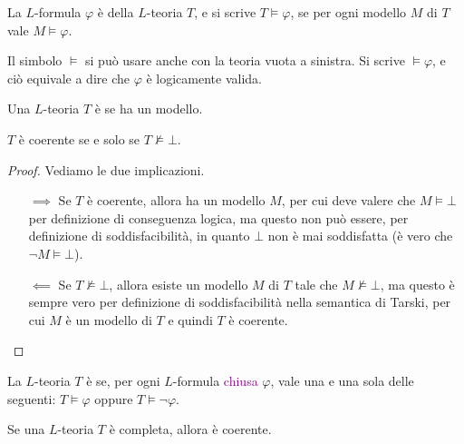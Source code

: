 \begin{definition}
    La $L$-formula $\varphi$ è  della $L$-teoria $T$, e si scrive $T \models \varphi$, se per ogni modello $M$ di $T$ vale $M \models \varphi$.
\end{definition}

\begin{note}
    Il simbolo $\models$ si può usare anche con la teoria vuota a sinistra. Si scrive $\models \varphi$, e ciò equivale a dire che $\varphi$ è logicamente valida.
\end{note}

\begin{definition}[Coerenza]
    Una $L$-teoria $T$ è  se ha un modello.
\end{definition}

\begin{remark}
    $T$ è coerente se e solo se $T \not \models \bot$.
\end{remark}

\begin{proof}
    Vediamo le due implicazioni.
    \begin{itemize}
        \item [$\boxed{\implies}$] Se $T$ è coerente, allora ha un modello $M$, per cui deve valere che $M \models \bot$ per definizione di conseguenza logica, ma questo non può essere, per definizione di soddisfacibilità, in quanto $\bot$ non è mai soddisfatta (è vero che $\neg M \models \bot$).
        \item [$\boxed{\impliedby}$] Se $T \not \models \bot$, allora esiste un modello $M$ di $T$ tale che $M \not \models \bot$, ma questo è sempre vero per definizione di soddisfacibilità nella semantica di Tarski, per cui $M$ è un modello di $T$ e quindi $T$ è coerente.
    \end{itemize}
\end{proof}

\begin{definition}[Completezza]
    La $L$-teoria $T$ è  se, per ogni $L$-formula \textcolor{purple}{chiusa} $\varphi$, vale una e una sola delle seguenti: $T \models \varphi$ oppure $T \models \neg \varphi$.
\end{definition}

\begin{remark}
    Se una $L$-teoria $T$ è completa, allora è coerente.
\end{remark}

